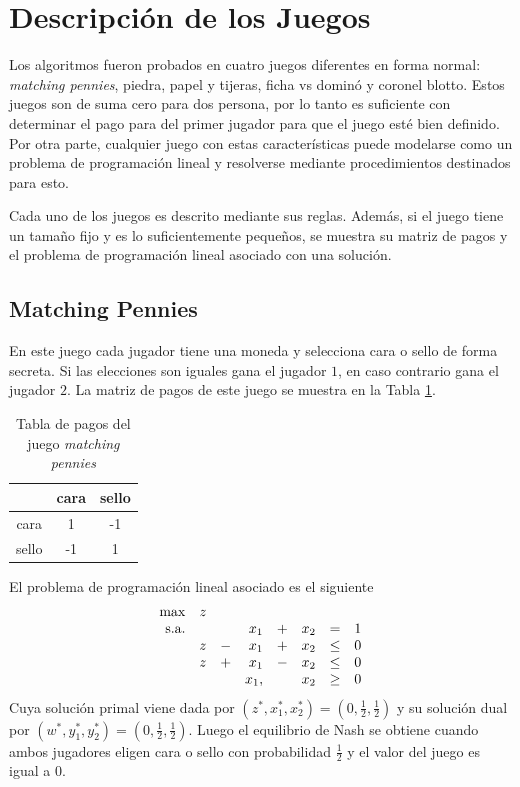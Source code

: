 \section{Descripción de los Juegos}

Los algoritmos fueron probados en cuatro juegos diferentes en forma normal: \textit{matching pennies}, piedra, papel y tijeras, ficha vs dominó y coronel blotto. Estos juegos son de suma cero para dos persona, por lo tanto es suficiente con determinar el pago para del primer jugador para que el juego esté bien definido. Por otra parte, cualquier juego con estas características puede modelarse como un problema de programación lineal \cite[pp. 228-233]{bib:pl-chvatal} y resolverse mediante procedimientos destinados para esto.

Cada uno de los juegos es descrito mediante sus reglas. Además, si el juego tiene un tamaño fijo y es lo suficientemente pequeños, se muestra su matriz de pagos y el problema de programación lineal asociado con una solución.

\subsection{Matching Pennies}

En este juego cada jugador tiene una moneda y selecciona cara o sello de forma secreta. Si las elecciones son iguales gana el jugador $1$, en caso contrario gana el jugador $2$. La matriz de pagos de este juego se muestra en la Tabla \ref{table:pagos-matching-pennies}.

\begin{table}[ht]
\begin{center}
\caption[Tabla de pagos del juego matching pennies]{Tabla de pagos del juego \textit{matching pennies}}
\label{table:pagos-matching-pennies}
\begin{tabular}{ c | c | c |}
 & cara & sello  \\ \hline
 cara  &  1 & -1 \\ \hline
 sello & -1 &  1 \\ \hline
\end{tabular}
\end{center}
\end{table}

El problema de programación lineal asociado es el siguiente
\begin{equation}
\begin{array}{r r r r r r r r}
\max  & z &  & & & & &\\
\text{s.a.}  
&   &   & x_1  & + & x_2 & = & 1 \\
& z & - & x_1  & + & x_2 & \leq & 0 \\
& z & + & x_1  & - & x_2 & \leq & 0 \\
&   &   & x_1, &   & x_2 & \geq & 0
\end{array}
\end{equation}
Cuya solución primal viene dada por $(z^*, x_1^*, x_2^*) = (0, \frac{1}{2}, \frac{1}{2})$ y su solución dual por $(w^*, y^*_1, y^*_2) = (0, \frac{1}{2}, \frac{1}{2})$. Luego el equilibrio de Nash se obtiene cuando ambos jugadores eligen cara o sello con probabilidad $\frac{1}{2}$ y el valor del juego es igual a $0$.

